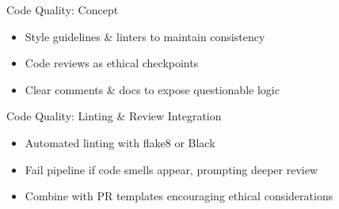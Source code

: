 \documentclass[aspectratio=169]{beamer}
\begin{document}


\begin{frame}{Code Quality: Concept}
\begin{itemize}
\item Style guidelines \& linters to maintain consistency
\item Code reviews as ethical checkpoints
\item Clear comments \& docs to expose questionable logic
\end{itemize}
\end{frame}



\begin{frame}{Code Quality: Linting \& Review Integration}
\begin{itemize}
\item Automated linting with flake8 or Black
\item Fail pipeline if code smells appear, prompting deeper review
\item Combine with PR templates encouraging ethical considerations
\end{itemize}
\end{frame}
\end{document}
